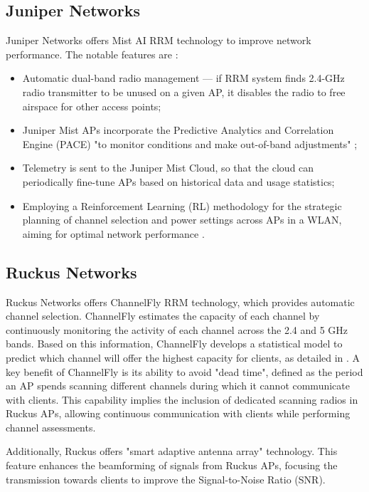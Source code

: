 \subsection{Juniper Networks}
Juniper Networks offers Mist AI RRM technology to improve network performance. The notable features are \cite{junipernetworksUnderstandingRadioResource2023,RadioManagementTechnology}:
\begin{itemize}
    \item Automatic dual-band radio management --- if RRM system finds 2.4-GHz radio transmitter to be unused on a given AP, it disables the radio to free airspace for other access points;
    \item Juniper Mist APs incorporate the Predictive Analytics and Correlation Engine (PACE) "to monitor conditions and make out-of-band adjustments" \cite{RadioManagementTechnology};
    \item Telemetry is sent to the Juniper Mist Cloud, so that the cloud can periodically fine-tune APs based on historical data and usage statistics;
    \item Employing a Reinforcement Learning (RL) methodology for the strategic planning of channel selection and power settings across APs in a WLAN, aiming for optimal network performance \cite{junipernetworksUnderstandingRadioResource2023}.
\end{itemize}

\subsection{Ruckus Networks}
Ruckus Networks offers ChannelFly RRM technology, which provides automatic channel selection. ChannelFly estimates the capacity of each channel by continuously monitoring the activity of each channel across the 2.4 and 5 GHz bands. Based on this information, ChannelFly develops a statistical model to predict which channel will offer the highest capacity for clients, as detailed in \cite{RuckusChannelFlyFeature2023}. A key benefit of ChannelFly is its ability to avoid "dead time", defined as the period an AP spends scanning different channels during which it cannot communicate with clients. This capability implies the inclusion of dedicated scanning radios in Ruckus APs, allowing continuous communication with clients while performing channel assessments.

Additionally, Ruckus offers "smart adaptive antenna array" technology. This feature enhances the beamforming of signals from Ruckus APs, focusing the transmission towards clients to improve the Signal-to-Noise Ratio (SNR).

